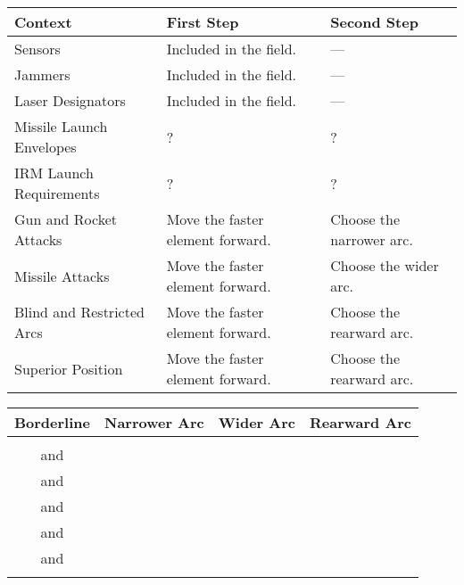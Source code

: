 \begin{twocolumntablefloat}

\begin{twocolumntable}


\begin{tabularx}{0.8\linewidth}{lLl}
\toprule
Context&First Step&Second Step\\
\midrule
Sensors&Included in the field.&---\\
Jammers&Included in the field.&---\\
Laser Designators&Included in the field.&---\\
Missile Launch Envelopes&?&?\\
IRM Launch Requirements&?&?\\
Gun and Rocket Attacks&Move the faster element forward.&Choose the narrower arc.\\
Missile Attacks&Move the faster element forward.&Choose the wider arc.\\
Blind and Restricted Arcs&Move the faster element forward.&Choose the rearward arc.\\
Superior Position&Move the faster element forward.&Choose the rearward arc.\\
\bottomrule
\end{tabularx}


\end{twocolumntable}

\vspace{\floatsep}

\begin{twocolumntable}


\begin{tabularx}{0.8\linewidth}{CCCC}
\toprule
Borderline&Narrower Arc&Wider Arc&Rearward Arc\\
\midrule
{}                                &\phantom{0}&\phantom{0}&\phantom{0}\\
\phantom{0} and \phantom{0}&\phantom{0}&\phantom{0}&\phantom{0}\\
\phantom{0} and \phantom{0}&\phantom{0}&\phantom{0}&\phantom{0}\\
\phantom{0} and \phantom{}&\phantom{0}&\phantom{}&\phantom{0}\\
\phantom{} and \phantom{}&\phantom{}&\phantom{}&\phantom{}\\
\phantom{} and \phantom{}&\phantom{}&\phantom{}&\phantom{}\\
                              &\phantom{}&\phantom{}&\phantom{}\\
\bottomrule
\end{tabularx}

\end{twocolumntable}


\end{twocolumntablefloat}
